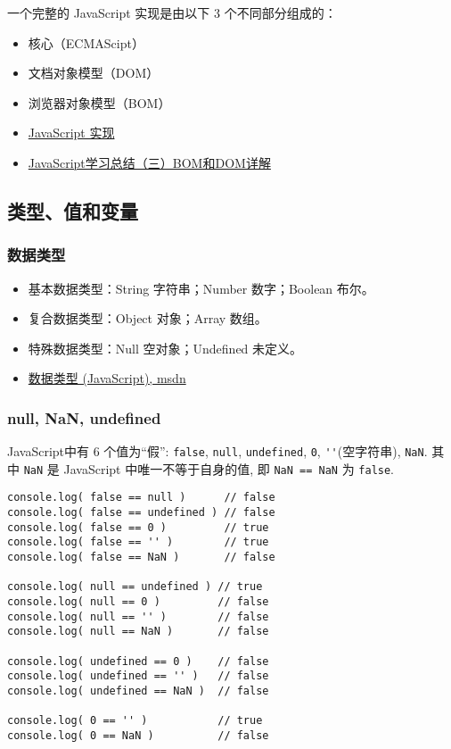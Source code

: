 一个完整的 JavaScript 实现是由以下 3 个不同部分组成的：

\begin{itemize}
\item
  核心（ECMAScipt）
\item
  文档对象模型（DOM）
\item
  浏览器对象模型（BOM）
\item
  \href{http://www.w3school.com.cn/js/pro_js_implement.asp}{JavaScript
  实现}
\item
  \href{http://segmentfault.com/a/1190000000654274}{JavaScript学习总结（三）BOM和DOM详解}
\end{itemize}

\subsection{类型、值和变量}\label{ux7c7bux578bux503cux548cux53d8ux91cf}

\subsubsection{数据类型}\label{ux6570ux636eux7c7bux578b}

\begin{itemize}
\item
  基本数据类型：String 字符串；Number 数字；Boolean 布尔。
\item
  复合数据类型：Object 对象；Array 数组。
\item
  特殊数据类型：Null 空对象；Undefined 未定义。
\item
  \href{https://msdn.microsoft.com/zh-cn/library/7wkd9z69(v=vs.94).aspx}{数据类型
  (JavaScript), msdn}
\end{itemize}

\subsubsection{null, NaN, undefined}\label{null-nan-undefined}

JavaScript中有 6 个值为``假'': \lstinline!false!, \lstinline!null!,
\lstinline!undefined!, \lstinline!0!, \lstinline!''!(空字符串),
\lstinline!NaN!. 其中 \lstinline!NaN! 是 JavaScript
中唯一不等于自身的值, 即 \lstinline!NaN == NaN! 为 \lstinline!false!.

\begin{lstlisting}
console.log( false == null )      // false
console.log( false == undefined ) // false
console.log( false == 0 )         // true
console.log( false == '' )        // true
console.log( false == NaN )       // false

console.log( null == undefined ) // true
console.log( null == 0 )         // false
console.log( null == '' )        // false
console.log( null == NaN )       // false

console.log( undefined == 0 )    // false
console.log( undefined == '' )   // false
console.log( undefined == NaN )  // false

console.log( 0 == '' )           // true
console.log( 0 == NaN )          // false
\end{lstlisting}

